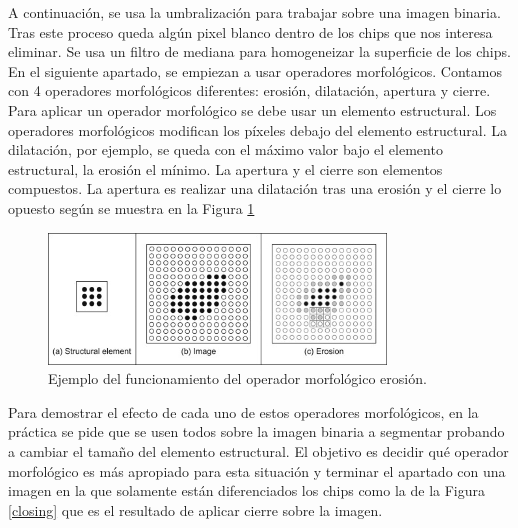 \documentclass[a4paper,12pt]{report}
\begin{document}
A continuación, se usa la umbralización para trabajar sobre una imagen binaria. Tras este proceso queda algún pixel blanco dentro de los chips que nos interesa eliminar. Se usa un filtro de mediana para homogeneizar la superficie de los chips.\\

En el siguiente apartado, se empiezan a usar operadores morfológicos. Contamos con 4 operadores morfológicos diferentes: erosión, dilatación, apertura y cierre. Para aplicar un operador morfológico se debe usar un elemento estructural. Los operadores morfológicos modifican los píxeles debajo del elemento estructural. La dilatación, por ejemplo, se queda con el máximo valor bajo el elemento estructural, la erosión el mínimo. La apertura y el cierre son elementos compuestos. La apertura es realizar una dilatación tras una erosión y el cierre lo opuesto según se muestra en la Figura \ref{erosion}\\

\begin{figure}[h]
\centering
\includegraphics[width=0.8\textwidth]{imagenes/erosion}
\caption{Ejemplo del funcionamiento del operador morfológico erosión.}
\label{erosion}
\end{figure}

Para demostrar el efecto de cada uno de estos operadores morfológicos, en la práctica se pide que se usen todos sobre la imagen binaria a segmentar probando a cambiar el tamaño del elemento estructural. El objetivo es decidir qué operador morfológico es más apropiado para esta situación y terminar el apartado con una imagen en la que solamente están diferenciados los chips como la de la Figura \ref{closing} que es el resultado de aplicar cierre sobre la imagen.\\
\end{document}
